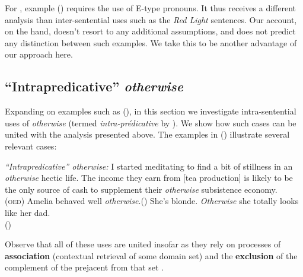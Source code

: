 For \citealt{Webber2001}, example (\lastx) requires the use of E-type pronouns. It thus receives a different analysis than inter-sentential uses such as the \textit{Red Light} sentences. Our account, on the hand, doesn't resort to any additional assumptions, and does not predict any distinction between such examples. We take this to be another advantage of our approach here.


\subsection{``Intrapredicative'' \textit{otherwise}}
\label{sec:intra}

Expanding on examples such as (\lastx), in this section we investigate intra-sentential uses of \textit{otherwise} (termed \textit{intra-prédicative} by \citealt{Flament-Boistrancourt2011}). We show how such cases can be united with the analysis presented above. The examples in (\nextx) illustrate several relevant cases:

\pex \label{intra-adj}\textit{``Intrapredicative'' \emph{otherwise}:}
\a  I started meditating to find a bit of stillness in an \textit{otherwise} hectic life. 
\a  The income they earn from [tea production] is likely to be the only source of cash to supplement their \textit{otherwise} subsistence economy.\\\-\hfill(\textsc{oed})
\a  Amelia behaved well \textit{otherwise}.\hspace*{\fill}(\citealt{Flament-Boistrancourt2011})
\a  She's blonde. \textit{Otherwise} she totally looks like her dad.\\\-\hfill (\citealp[124]{Inkova-Manzotti2002})\xe



Observe that all of these uses are united insofar as they rely on processes of \textbf{association} (contextual retrieval of some domain set) and the \textbf{exclusion} of the complement of the prejacent from that set \citep[see][]{Webber2001}.

